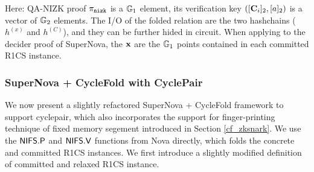 Here:
QA-NIZK proof $\pi_\texttt{nizk}$ is a ${\mathbb{G}}_1$ element,
its verification key $\left([{{\mathbf {C}}}_i]_2, [a]_2\right)$ is a vector of ${\mathbb{G}}_2$
elements. The I/O of the folded relation are the two hashchains
($h^{(x)}$ and $h^{(C)}$), and they can be further hided in circuit.
When applying to the decider proof of SuperNova, the
${{\mathbf {x}}}$ are the ${\mathbb{G}}_1$ points contained in each committed R1CS instance.

\subsubsection{SuperNova \cite{SuperNova} + CycleFold \cite{CycleFold} with CyclePair}
We now present a slightly refactored SuperNova \cite{SuperNova} + 
CycleFold \cite{CycleFold}
framework to support cyclepair, which also incorporates
the support for finger-printing technique of fixed memory segement
introduced in Section \ref{cf_zksnark}. We use the
$\mathsf{NIFS.P}$ and $\mathsf{NIFS.V}$ functions from Nova \cite{Nova} directly,
which folds the concrete and committed R1CS instances.
We first introduce a slightly
modified definition of committed and relaxed R1CS instance.

% 
% 

